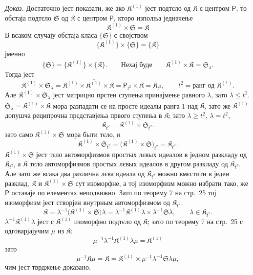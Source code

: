 \documentclass[11pt]{article}
\begin{document}
\emph{Доказ.} Достаточно јест показати, же ако \(\mathfrak K^{(1)}\) јест подтєло од \(\mathfrak K\) с центром \(\mathsf P\), то обстаја подтєло \(\mathfrak S\) од \(\mathfrak K\) с центром \(\mathsf P\), кторо изполња једначење
\[
\mathfrak K^{(1)}\times\mathfrak S=\mathfrak K
\]
В всаком случају обстаја класа \(\{\mathfrak S\}\) с својством
\[
\{\mathfrak K^{(1)}\}\times\{\mathfrak S\}=\{\mathfrak K\}
\]
јменно
\[
\{\mathfrak S\}=\{\overline{\mathfrak K^{(1)}}\}\times\{\mathfrak K\}.
\qquad
\text{Нехај буде}\qquad
\overline{\mathfrak K^{(1)}}\times\mathfrak K=\mathfrak S_\lambda.
\]
Тогда јест
\[
\mathfrak K^{(1)}\times\mathfrak S_\lambda
=\mathfrak K^{(1)}\times\overline{\mathfrak K^{(1)}}\times\mathfrak K
=\mathsf P_{t^2}\times\mathfrak K
=\mathfrak K_{t^2},
\qquad
t^2=\text{ранг од }\mathfrak K^{(1)}.
\]
Але \(\mathfrak K^{(1)}\times\mathfrak S_\lambda\) јест матрицно прстен ступења принајмење равного \(\lambda\), зато \(\lambda\leq t^2\). \(\mathfrak S_\lambda=\overline{\mathfrak K^{(1)}}\times\mathfrak K\) мора разпадати се на просте идеалы ранга 1 над \(\mathfrak K\), зато же \(\overline{\mathfrak K^{(1)}}\) допушча реципрочна прєдставјења првого ступења в \(\mathfrak K\); зато \(\lambda\geq t^2\), \(\lambda=t^2\),
\[
\mathfrak K_{t^2}=\mathfrak K^{(1)}\times\mathfrak S_{t^2}.
\]
зато само \(\mathfrak K^{(1)}\times\mathfrak S\) мора быти тєло, и
\[
\mathfrak K^{(1)}\times\mathfrak S_{t^2}
=\bigl(\mathfrak K^{(1)}\times\mathfrak S\bigr)_{t^2}
=\mathfrak K_{t^2}.
\]
\(\mathfrak K^{(1)}\times\mathfrak S\) јест тєло автоморфизмов простых лєвых идеалов в једном разкладу од \(\mathfrak K_{t^2}\), а \(\mathfrak K\) тєло автоморфизмов простых лєвых идеалов в другом разкладу од \(\mathfrak K_{t^2}\). Але зато же всака два различна лєва идеала од \(\mathfrak K_{t^2}\) можно вмєстити в једен разклад, \(\mathfrak K\) и \(\mathfrak K^{(1)}\times\mathfrak S\) сут изоморфне, а тој изоморфизм можно избрати тако, же \(\mathsf P\) оставаје по елементах неподвижно. Зато по теорему 7 на стр.~25 тој изоморфизм јест створјен внутрным автоморфизмом од \(\mathfrak K_{t^2}\).
\[
\mathfrak K
=\lambda^{-1}\bigl(\mathfrak K^{(1)}\times\mathfrak S\bigr)\lambda
=\lambda^{-1}\mathfrak K^{(1)}\lambda\times\lambda^{-1}\mathfrak S\lambda,
\qquad
\lambda\in\mathfrak K_{t^2}.
\]
\(\lambda^{-1}\mathfrak K^{(1)}\lambda\) јест с \(\mathfrak K^{(1)}\) изоморфно подтєло од \(\mathfrak K\); зато по теорему 7 на стр.~25 с одговарјајучим \(\mu\) из \(\mathfrak K\):
\[
\mu^{-1}\lambda^{-1}\mathfrak K^{(1)}\lambda\mu=\mathfrak K^{(1)}
\]
зато
\[
\mu^{-1}\mathfrak K\mu
=\mathfrak K
=\mathfrak K^{(1)}\times\mu^{-1}\lambda^{-1}\mathfrak S\lambda\mu,
\]
чим јест тврджење доказано.
\end{document}
